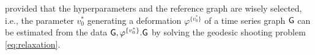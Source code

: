 
provided that the hyperparameters and the reference graph are wisely selected, i.e., the parameter $v_0^*$ generating a deformation $\varphi^{\{v_0^*\}}$ of a time series graph $\mathsf{G}$ can be estimated from the data $\mathsf{G},\varphi^{\{v_0^*\}}.\mathsf{G}$ by solving the geodesic shooting problem \eqref{eq:relaxation}. 

